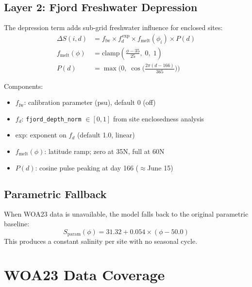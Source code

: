 \documentclass[11pt,letterpaper]{article}
\begin{document}
\subsection{Layer 2: Fjord Freshwater Depression}

The depression term adds sub-grid freshwater influence for enclosed sites:
\begin{align}
    \Delta S(i, d) &= f_\mathrm{fw} \times f_d^{\,\mathrm{exp}} \times
    f_\mathrm{melt}(\phi_i) \times P(d) \\[0.3em]
    f_\mathrm{melt}(\phi) &= \mathrm{clamp}\!\left(\frac{\phi - 35}{25},\;0,\;1\right) \\[0.3em]
    P(d) &= \max\!\bigl(0,\;\cos\!\bigl(\tfrac{2\pi(d - 166)}{365}\bigr)\bigr)
\end{align}

\noindent Components:
\begin{itemize}[nosep]
    \item $f_\mathrm{fw}$: calibration parameter (psu), default 0 (off)
    \item $f_d$: \texttt{fjord\_depth\_norm} $\in [0, 1]$ from site
          enclosedness analysis
    \item exp: exponent on $f_d$ (default 1.0, linear)
    \item $f_\mathrm{melt}(\phi)$: latitude ramp; zero at 35\textdegree{}N,
          full at 60\textdegree{}N
    \item $P(d)$: cosine pulse peaking at day 166 ($\approx$June 15)
\end{itemize}

\subsection{Parametric Fallback}

When WOA23 data is unavailable, the model falls back to the original
parametric baseline:
\begin{equation}
    S_\mathrm{param}(\phi) = 31.32 + 0.054 \times (\phi - 50.0)
\end{equation}
This produces a constant salinity per site with no seasonal cycle.

\section{WOA23 Data Coverage}
\end{document}
